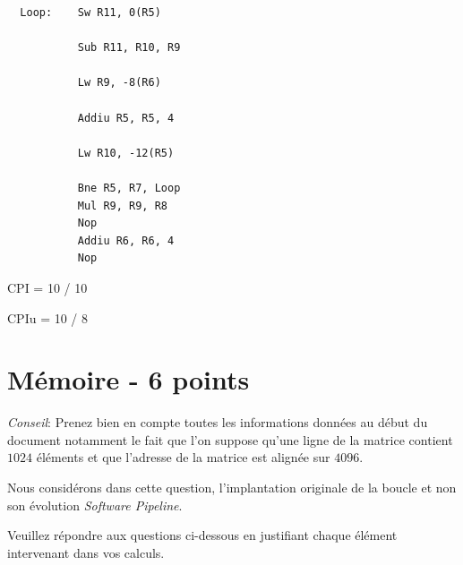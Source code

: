 \begin{correction}

  \begin{verbatim}
  Loop:    Sw R11, 0(R5)

           Sub R11, R10, R9

           Lw R9, -8(R6)

           Addiu R5, R5, 4

           Lw R10, -12(R5)

           Bne R5, R7, Loop
           Mul R9, R9, R8
           Nop
           Addiu R6, R6, 4
           Nop
  \end{verbatim}

  CPI = 10 / 10

  CPIu = 10 / 8

\end{correction}

%
%

\section{M\'emoire - 6 points}

\textit{Conseil}: Prenez bien en compte toutes les informations
donn\'ees au d\'ebut du document notamment le fait que l'on suppose qu'une
ligne de la matrice contient $1024$ \'el\'ements et que l'adresse de la
matrice est align\'ee sur $4096$.

Nous consid\'erons dans cette question, l'implantation originale de la
boucle et non son \'evolution \textit{Software Pipeline}.

Veuillez r\'epondre aux questions ci-dessous en justifiant chaque \'el\'ement
intervenant dans vos calculs.

